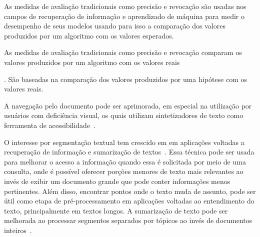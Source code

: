 



As medidas de avaliação tradicionais como precisão e revocação são usadas nos campos de recuperação de informação e aprendizado de máquina para medir o desempenho de seus modelos usando para isso a comparação dos valores produzidos por um algoritmo com os valores esperados.



As medidas de avaliação tradicionais como precisão e revocação comparam os valores produzidos por um algoritmo com os valores reais 



. São baseadas na comparação dos valores produzidos por uma hipótese com os valores reais. 












A navegação pelo documento pode ser aprimorada, em especial na utilização por usuários com deficiência visual, os quais utilizam  sintetizadores de texto como ferramenta de acessibilidade~\cite{Choi2000}. 








O interesse por segmentação textual tem crescido em em aplicações voltadas a recuperação de informação %
e sumarização de textos~\cite{Maziero2016}. %
Essa técnica pode ser usada para melhorar o acesso a informação quando essa é solicitada por meio de uma consulta, onde é possível oferecer porções menores de texto mais relevantes ao invés de exibir um documento grande que pode conter informações menos pertinentes.  Além disso, encontrar pontos onde o texto muda de assunto, pode ser útil como etapa de pré-processamento em aplicações voltadas ao entendimento do texto, principalmente em textos longos. 
A sumarização de texto pode ser melhorada ao processar segmentos separados por tópicos ao invés de documentos inteiros~\cite{Bhatia2016, Maziero2016, Bokaei2016}. 

